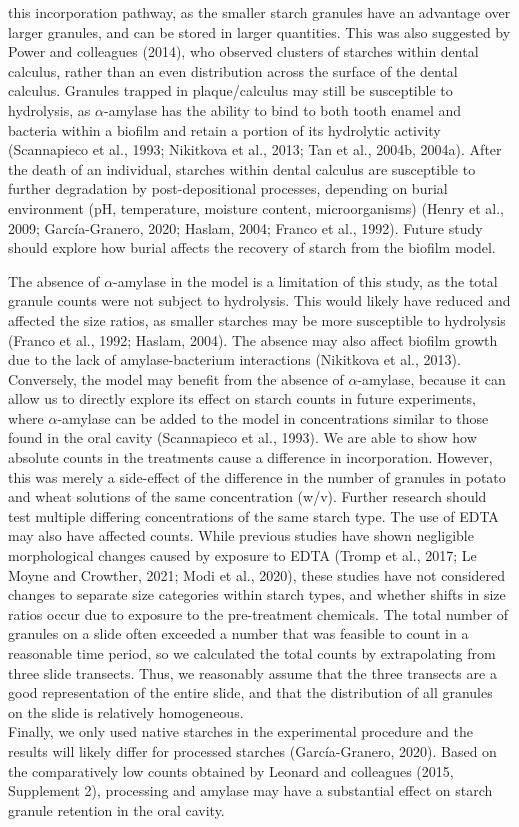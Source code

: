 \documentclass[utf8]{frontiers/frontiersSCNS}
\begin{document}
this incorporation pathway, as the smaller starch granules have an advantage over
larger granules, and can be stored in larger quantities.
This was also suggested by Power and colleagues (2014), who
observed clusters of starches within dental calculus, rather than an even
distribution across the surface of the dental calculus.
Granules trapped
in plaque/calculus may still be susceptible to hydrolysis, as \(\alpha\)-amylase has
the ability to bind to both tooth enamel and bacteria within a biofilm and retain
a portion of its hydrolytic activity
(Scannapieco et al., 1993; Nikitkova et al., 2013; Tan et al., 2004b, 2004a).
After the death of an individual, starches within dental calculus are susceptible
to further degradation by post-depositional processes, depending on burial environment
(pH, temperature, moisture content, microorganisms)
(Henry et al., 2009; García-Granero, 2020; Haslam, 2004; Franco et al., 1992).
Future study should explore how burial affects the recovery of starch from the
biofilm model.

The absence of \(\alpha\)-amylase in the model is a limitation of this study, as
the total granule counts were not subject to hydrolysis. This would likely have
reduced and affected the size ratios, as smaller starches may be more
susceptible to hydrolysis
(Franco et al., 1992; Haslam, 2004). The absence may
also affect biofilm growth due to the lack of amylase-bacterium interactions
(Nikitkova et al., 2013). Conversely, the model may benefit from the
absence of \(\alpha\)-amylase, because it can allow us to directly explore
its effect on starch counts in future experiments, where \(\alpha\)-amylase can be
added to the model in concentrations similar to those found in the oral cavity
(Scannapieco et al., 1993).
We are able to show how absolute counts in the treatments cause a difference in
incorporation. However, this
was merely a side-effect of the difference in the number of granules in potato and
wheat solutions of the same concentration (w/v). Further research should test
multiple differing concentrations of the same starch type.
The use of EDTA may also have affected counts. While previous studies have shown
negligible morphological changes caused by exposure to EDTA
(Tromp et al., 2017; Le Moyne and Crowther, 2021; Modi et al., 2020),
these studies have not considered changes to separate size
categories within starch types, and whether shifts in size ratios occur due to
exposure to the pre-treatment chemicals.
The total number of granules on a slide often exceeded a number that
was feasible to count in a reasonable time period, so we calculated the total
counts by extrapolating from three slide transects.
Thus, we reasonably assume that the three transects are a good representation
of the entire slide, and that the distribution of all granules on the slide is
relatively homogeneous.\\
Finally, we only used native starches in the experimental procedure and the results
will likely differ for processed starches (García-Granero, 2020).
Based on the comparatively low counts obtained by Leonard
and colleagues (2015, Supplement 2), processing and amylase
may have a substantial effect on starch granule retention in the oral cavity.
\end{document}
